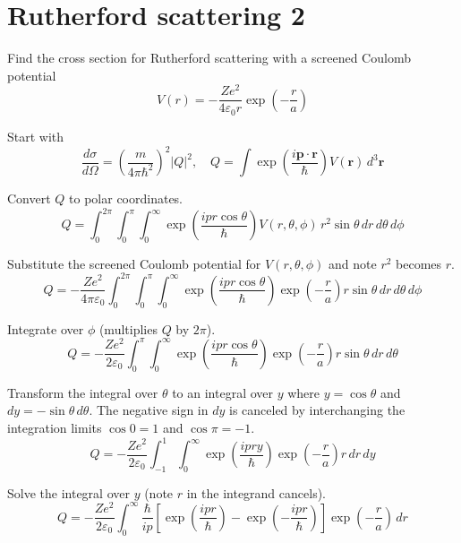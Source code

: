 

\section*{Rutherford scattering 2}

Find the cross section for Rutherford scattering with a screened Coulomb potential
\begin{equation*}
V(r)=-\frac{Ze^2}{4\varepsilon_0r}\exp\left(-\frac{r}{a}\right)
\end{equation*}

Start with
\begin{equation*}
\frac{d\sigma}{d\Omega}=
\left(\frac{m}{4\pi\hbar^2}\right)^2|Q|^2,\quad
Q=\int\exp\left(\frac{i\mathbf p\cdot\mathbf r}{\hbar}\right)V(\mathbf r)\,d^3\mathbf r
\end{equation*}

Convert $Q$ to polar coordinates.
\begin{equation*}
Q=\int_0^{2\pi}
\int_0^\pi
\int_0^\infty
\exp\left(\frac{ipr\cos\theta}{\hbar}\right)V(r,\theta,\phi)
\,r^2\sin\theta\,dr\,d\theta\,d\phi
\end{equation*}

Substitute the screened Coulomb potential for $V(r,\theta,\phi)$ and note $r^2$ becomes $r$.
\begin{equation*}
Q=-\frac{Ze^2}{4\pi\varepsilon_0}
\int_0^{2\pi}
\int_0^\pi
\int_0^\infty
\exp\left(\frac{ipr\cos\theta}{\hbar}\right)
\exp\left(-\frac{r}{a}\right)
r\sin\theta\,dr\,d\theta\,d\phi
\end{equation*}

Integrate over $\phi$ (multiplies $Q$ by $2\pi$).
\begin{equation*}
Q=-\frac{Ze^2}{2\varepsilon_0}
\int_0^\pi
\int_0^\infty
\exp\left(\frac{ipr\cos\theta}{\hbar}\right)
\exp\left(-\frac{r}{a}\right)
r\sin\theta\,dr\,d\theta
\end{equation*}

Transform the integral over $\theta$ to an integral over $y$
where $y=\cos\theta$ and $dy=-\sin\theta\,d\theta$.
The negative sign in $dy$ is canceled by interchanging the integration limits
$\cos0=1$ and $\cos\pi=-1$.
\begin{equation*}
Q=-\frac{Ze^2}{2\varepsilon_0}
\int_{-1}^1
\int_0^\infty
\exp\left(\frac{ipry}{\hbar}\right)
\exp\left(-\frac{r}{a}\right)
r\,dr\,dy
\end{equation*}

Solve the integral over $y$ (note $r$ in the integrand cancels).
\begin{equation*}
Q=-\frac{Ze^2}{2\varepsilon_0}
\int_0^\infty
\frac{\hbar}{ip}
\left[\exp\left(\frac{ipr}{\hbar}\right)-\exp\left(-\frac{ipr}{\hbar}\right)\right]
\exp\left(-\frac{r}{a}\right)
\,dr
\end{equation*}

